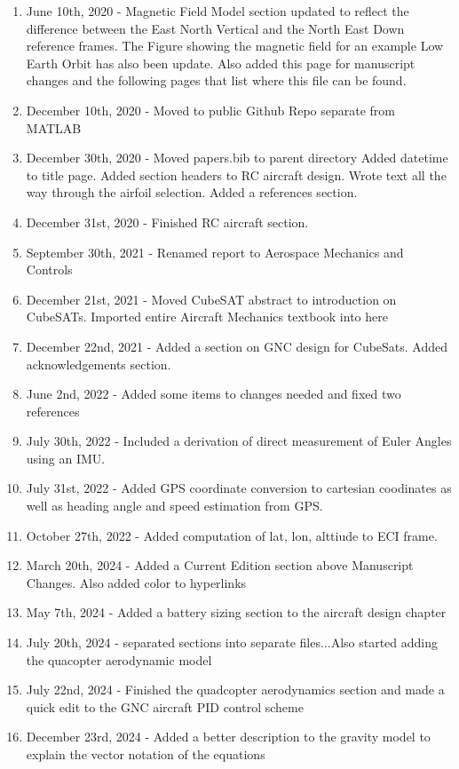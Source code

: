 \begin{enumerate}[itemsep=-5pt]
\item June 10th, 2020 - Magnetic Field Model section updated to
  reflect the difference between the East North Vertical and the North
  East Down reference frames. The Figure showing the magnetic field
  for an example Low Earth Orbit has also been update. Also added this
  page for manuscript changes and the following pages that list where
  this file can be found.
\item December 10th, 2020 - Moved to public Github Repo separate from
  MATLAB
\item December 30th, 2020 - Moved papers.bib to parent directory Added
  datetime to title page. Added  section headers to RC aircraft
  design. Wrote text all the way through the airfoil selection. Added
  a references section.
\item December 31st, 2020 - Finished RC aircraft section.
\item September 30th, 2021 - Renamed report to Aerospace Mechanics and
  Controls
\item December 21st, 2021 - Moved CubeSAT abstract to introduction on
  CubeSATs. Imported entire Aircraft Mechanics textbook into here
\item December 22nd, 2021 - Added a section on GNC design for
  CubeSats. Added acknowledgements section.
\item June 2nd, 2022 - Added some items to changes needed and fixed
  two references
\item July 30th, 2022 - Included a derivation of direct measurement of Euler Angles using an IMU.
\item July 31st, 2022 - Added GPS coordinate conversion to cartesian coodinates as well as heading angle and speed estimation from GPS.
\item October 27th, 2022 - Added computation of lat, lon, alttiude to ECI frame.
\item March 20th, 2024 - Added a Current Edition section above
  Manuscript Changes. Also added color to hyperlinks
\item May 7th, 2024 - Added a battery sizing section to the aircraft
  design chapter
\item July 20th, 2024 - separated sections into separate files...Also started adding the quacopter aerodynamic model
\item July 22nd, 2024 - Finished the quadcopter aerodynamics section and made a quick edit to the GNC aircraft PID control scheme
\item December 23rd, 2024 - Added a better description to the gravity model to explain the vector notation of the equations

\end{enumerate}
